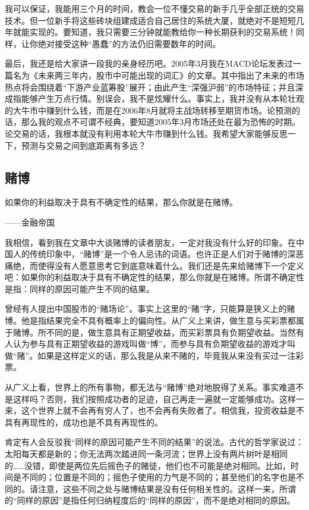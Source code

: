 我可以保证，我能用三个月的时间，教会一位不懂交易的新手几乎全部正统的交易技术。但一位新手将这些砖块组建成适合自己居住的系统大厦，就绝对不是短短几年就能实现的。要知道，我只需要三分钟就能教给你一种长期获利的交易系统！同样，让你绝对接受这种“愚蠢”的方法仍旧需要数年的时间。

最后，我还是给大家讲一段我的亲身经历吧。2005年3月我在MACD论坛发表过一篇名为《未来两三年内，股市中可能出现的词汇》的文章。其中指出了未来的市场热点将会围绕着“下游产业蓝筹股”展开；由此产生“深强沪弱”的市场特征；并且深成指能够产生万点行情。别误会，我不是炫耀什么。事实上，我并没有从本轮壮观的大牛市中赚到什么钱，而是在2006年8月就将主战场转移至期货市场。论预测的话，那么我的观点不可谓不经典，要知道2005年3月市场还处在最为恐怖的时期。论交易的话，我根本就没有利用本轮大牛市赚到什么钱。我希望大家能够反思一下，预测与交易之间到底距离有多远？

\subsection{赌博}

{\kaishu
如果你的利益取决于具有不确定性的结果，那么你就是在赌博。

\hfill ——金融帝国
}

我相信，看到我在文章中大谈赌博的读者朋友，一定对我没有什么好的印象。在中国人的传统印象中，“赌博”是一个令人忌讳的词语。也许正是人们对于赌博的深恶痛绝，而使得没有人愿意思考它到底意味着什么。我们还是先来给赌博下一个定义吧：如果你的利益取决于具有不确定性的结果，那么你就是在赌博。所谓不确定性是指：同样的原因可能产生不同的结果。

曾经有人提出中国股市的“赌场论”。事实上这里的“赌”字，只能算是狭义上的赌博。他是指结果完全不具有概率上的偏向性。从广义上来讲，做生意与买彩票都属于赌博。所不同的是，做生意具有正期望收益，而买彩票具有负期望收益。当然有人认为参与具有正期望收益的游戏叫做“博”，而参与具有负期望收益的游戏才叫做“赌”。如果是这样定义的话，那么我是从来不赌的，毕竟我从来没有买过一注彩票。

从广义上看，世界上的所有事物，都无法与“赌博”绝对地脱得了关系。事实难道不是这样吗？否则，我们按照成功者的足迹，自己再走一遍就一定能够成功。这样一来，这个世界上就不会再有穷人了，也不会再有失败者了。相信我，投资收益是不具有再现性的，成功也是不具有再现性的。

肯定有人会反驳我“同样的原因可能产生不同的结果”的说法。古代的哲学家说过：太阳每天都是新的；你无法两次踏进同一条河流；世界上没有两片树叶是相同的……没错，即使是两位先后摇色子的赌徒，他们也不可能是绝对相同。比如，时间是不同的；位置是不同的；摇色子使用的力气是不同的；甚至他们的名字也是不同的。请注意，这些不同之处与赌博结果是没有任何相关性的。这样一来，所谓的“同样的原因”是指任何归纳程度后的“同样的原因”，而不是绝对相同的原因。


